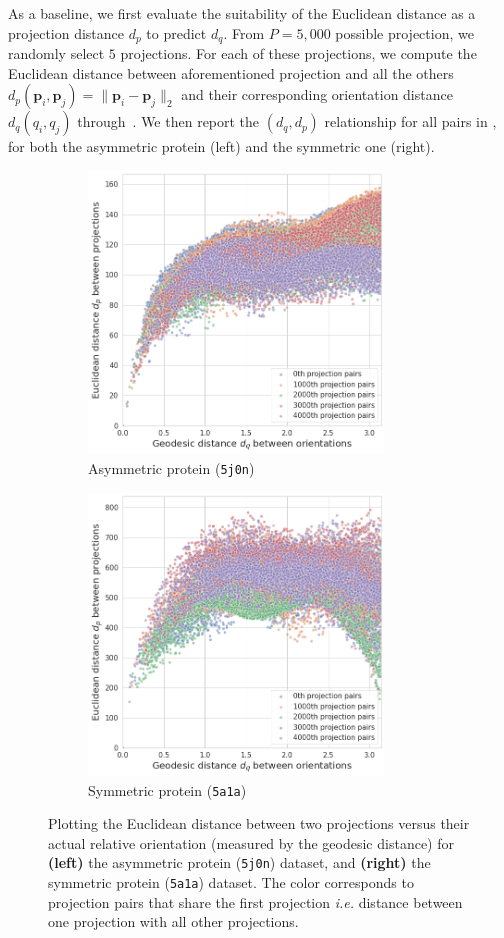 As a baseline, we first evaluate the suitability of the Euclidean distance as a projection distance $d_p$ to predict $d_q$.
From $P = 5,000$ possible projection, we randomly select $5$ projections.
For each of these projections, we compute the Euclidean distance between aforementioned projection and all the others $d_p(\mathbf{p}_i,\mathbf{p}_j)=\lVert\mathbf{p}_i-\mathbf{p}_j\rVert_2$ and their corresponding orientation distance $d_q(q_i,q_j)$ through~.
We then report the $(d_q,d_p)$ relationship for all pairs in , for both the asymmetric protein (left) and the symmetric one (right).

\begin{figure}[ht!]
    \centering
    \begin{subfigure}[t]{0.45\textwidth}
        \includegraphics[height=7.5cm]{images/eucl_notrobust_5j0n.png}
        \caption{Asymmetric protein (\texttt{5j0n})}
    \end{subfigure} \quad \quad
    \begin{subfigure}[t]{0.5\textwidth}
        \includegraphics[height=7.5cm]{images/eucl_notrobust_5a1a.png}
        \caption{Symmetric protein (\texttt{5a1a})}
    \end{subfigure}
    \caption{Plotting the Euclidean distance between two projections versus their actual relative orientation (measured by the geodesic distance) for \textbf{(left)} the asymmetric protein (\texttt{5j0n}) dataset, and \textbf{(right)} the symmetric protein (\texttt{5a1a}) dataset. The color corresponds to projection pairs that share the first projection \textit{i.e.} distance between one projection with all other projections.}
    \label{fig:euclidean-not-robust}
\end{figure}


